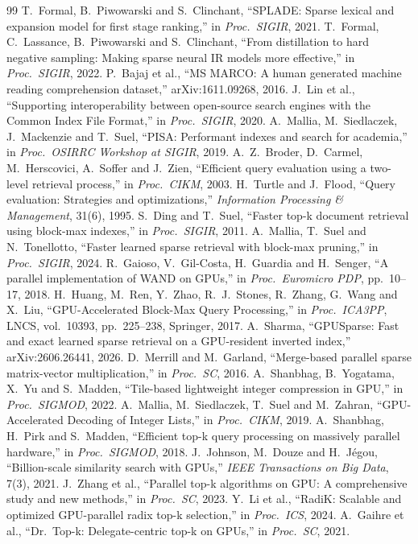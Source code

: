 \documentclass[11pt]{article}
\begin{document}
\begin{thebibliography}{99}\small
{} T.~Formal, B.~Piwowarski and S.~Clinchant, ``SPLADE: Sparse lexical and expansion model
for first stage ranking,'' in \emph{Proc.\ SIGIR}, 2021.
 T.~Formal, C.~Lassance, B.~Piwowarski and S.~Clinchant, ``From distillation to hard
negative sampling: Making sparse neural IR models more effective,'' in \emph{Proc.\ SIGIR}, 2022.
 P.~Bajaj et al., ``MS MARCO: A human generated machine reading comprehension dataset,''
arXiv:1611.09268, 2016.
 J.~Lin et al., ``Supporting interoperability between open-source search engines with the
Common Index File Format,'' in \emph{Proc.\ SIGIR}, 2020.
 A.~Mallia, M.~Siedlaczek, J.~Mackenzie and T.~Suel, ``PISA: Performant indexes and search
for academia,'' in \emph{Proc.\ OSIRRC Workshop at SIGIR}, 2019.
 A.~Z.~Broder, D.~Carmel, M.~Herscovici, A.~Soffer and J.~Zien, ``Efficient query
evaluation using a two-level retrieval process,'' in \emph{Proc.\ CIKM}, 2003.
 H.~Turtle and J.~Flood, ``Query evaluation: Strategies and optimizations,''
\emph{Information Processing \& Management}, 31(6), 1995.
 S.~Ding and T.~Suel, ``Faster top-k document retrieval using block-max indexes,'' in
\emph{Proc.\ SIGIR}, 2011.
 A.~Mallia, T.~Suel and N.~Tonellotto, ``Faster learned sparse retrieval with block-max
pruning,'' in \emph{Proc.\ SIGIR}, 2024.
 R.~Gaioso, V.~Gil-Costa, H.~Guardia and H.~Senger, ``A parallel implementation of
WAND on GPUs,'' in \emph{Proc.\ Euromicro PDP}, pp.~10--17, 2018.
 H.~Huang, M.~Ren, Y.~Zhao, R.~J.~Stones, R.~Zhang, G.~Wang and X.~Liu,
``GPU-Accelerated Block-Max Query Processing,'' in \emph{Proc.\ ICA3PP}, LNCS, vol.~10393,
pp.~225--238, Springer, 2017.
 A.~Sharma, ``GPUSparse: Fast and exact learned sparse retrieval on a GPU-resident
inverted index,'' arXiv:2606.26441, 2026.
 D.~Merrill and M.~Garland, ``Merge-based parallel sparse matrix-vector
multiplication,'' in \emph{Proc.\ SC}, 2016.
 A.~Shanbhag, B.~Yogatama, X.~Yu and S.~Madden, ``Tile-based lightweight integer
compression in GPU,'' in \emph{Proc.\ SIGMOD}, 2022.
 A.~Mallia, M.~Siedlaczek, T.~Suel and M.~Zahran, ``GPU-Accelerated Decoding
of Integer Lists,'' in \emph{Proc.\ CIKM}, 2019.
 A.~Shanbhag, H.~Pirk and S.~Madden, ``Efficient top-k query processing on massively
parallel hardware,'' in \emph{Proc.\ SIGMOD}, 2018.
 J.~Johnson, M.~Douze and H.~J\'egou, ``Billion-scale similarity search with GPUs,''
\emph{IEEE Transactions on Big Data}, 7(3), 2021.
 J.~Zhang et al., ``Parallel top-k algorithms on GPU: A comprehensive study and new
methods,'' in \emph{Proc.\ SC}, 2023.
 Y.~Li et al., ``RadiK: Scalable and optimized GPU-parallel radix top-k selection,'' in
\emph{Proc.\ ICS}, 2024.
 A.~Gaihre et al., ``Dr.\ Top-k: Delegate-centric top-k on GPUs,'' in \emph{Proc.\ SC},
2021.
\end{thebibliography}
\end{document}
